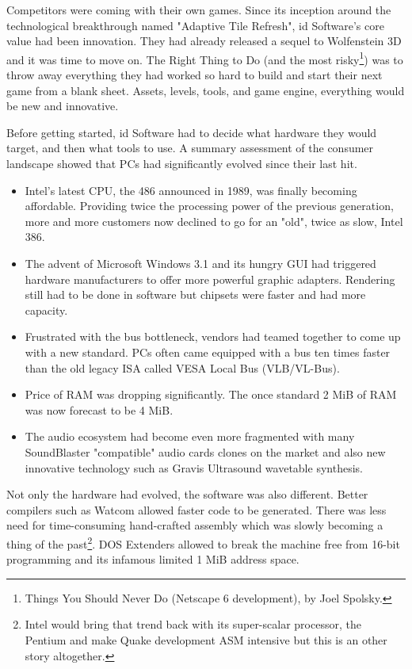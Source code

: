 Competitors were coming with their own games. Since its inception around the technological breakthrough named "Adaptive Tile Refresh", id Software's core value had been innovation. They had already released a sequel to Wolfenstein 3D and it was time to move on. The Right Thing to Do (and the most risky\footnote{Things You Should Never Do (Netscape 6 development), by Joel Spolsky.}) was to throw away everything they had worked so hard to build and start their next game from a blank sheet. Assets, levels, tools, and game engine, everything would be new and innovative.\\
\par
Before getting started, id Software had to decide what hardware they would target, and then what tools to use. A summary assessment of the consumer landscape showed that PCs had significantly evolved since their last hit.
\begin{itemize}
\item Intel's latest CPU, the 486 announced in 1989, was finally becoming affordable. Providing twice the processing power of the previous generation, more and more customers now declined to go for an "old", twice as slow, Intel 386. 
\item The advent of Microsoft Windows 3.1 and its hungry GUI had triggered hardware manufacturers to offer more powerful graphic adapters. Rendering  still had to be done in software but chipsets were faster and had more capacity.
\item Frustrated with the bus bottleneck, vendors had teamed together to come up with a new standard. PCs often came equipped with a bus ten times faster than the old legacy ISA called VESA Local Bus (VLB/VL-Bus). 
\item Price of RAM was dropping significantly. The once standard 2 MiB of RAM was now forecast to be 4 MiB. 
\item The audio ecosystem had become even more fragmented with many SoundBlaster "compatible" audio cards clones on the market and also new innovative technology such as Gravis Ultrasound wavetable synthesis.\\
\end{itemize}
 \par 
 Not only the hardware had evolved, the software was also different. Better compilers such as Watcom allowed faster code to be generated. There was less need for time-consuming hand-crafted assembly which was slowly becoming a thing of the past\footnote{Intel would bring that trend back with its super-scalar processor, the Pentium and make Quake development ASM intensive but this is an other story altogether.}. DOS Extenders allowed to break the machine free from 16-bit programming and its infamous limited 1 MiB address space.\\
